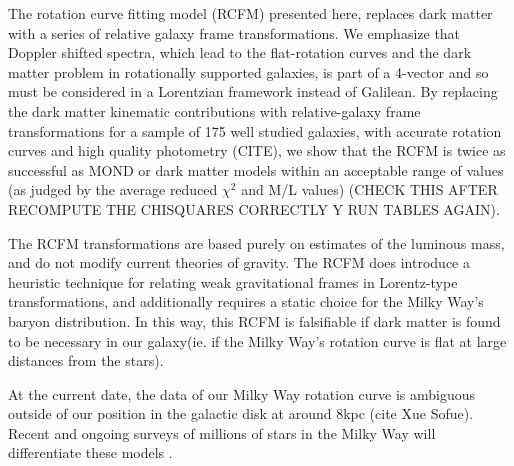 \documentclass[reprint,%
 amsmath,amssymb,
 aps,
]{revtex4-1}
\begin{document}
The   rotation curve fitting model (RCFM) presented here,     replaces dark matter with a series of   relative galaxy frame transformations. 
We emphasize that Doppler shifted spectra, which   lead to the flat-rotation curves and the dark matter problem in rotationally supported galaxies, is part of a 4-vector and so must be considered in a Lorentzian framework instead of Galilean. By replacing the  dark matter kinematic contributions with relative-galaxy frame transformations for a sample of 175  well studied galaxies, with accurate rotation curves and high quality photometry (CITE), we show that the RCFM is twice as successful  as MOND or dark matter models within an acceptable range of values (as judged by the average reduced $\chi^2$  and M/L values) (CHECK THIS AFTER RECOMPUTE THE CHISQUARES CORRECTLY Y RUN TABLES AGAIN).

 The RCFM transformations are  based purely on estimates of the luminous mass, and do not modify current theories of gravity.  The RCFM     does   introduce a heuristic technique for relating weak gravitational frames in Lorentz-type transformations, and additionally requires a static choice for the Milky Way's baryon distribution.  In this way, this RCFM    is falsifiable if dark matter  is  found to be necessary in our galaxy(ie. if the Milky Way's rotation curve is flat at large distances from the stars).
  
  At the current date, the data of our Milky Way rotation curve is ambiguous outside of our position in the galactic disk at around 8kpc (cite Xue Sofue).     Recent and ongoing    surveys of millions of  stars in the Milky Way will differentiate these models   \cite{2022ApJS..259...35A,2010ApJ...716....1B,de_Blok_2010}.  
  
 

  
 
   
 
  
  
     
     
\end{document}
